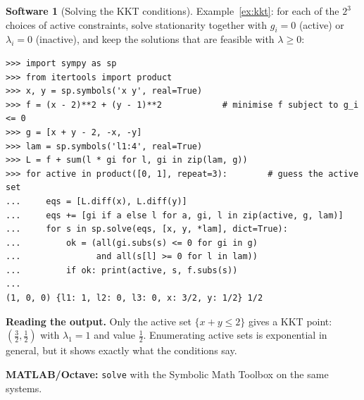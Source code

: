 \documentclass[11pt,a4paper]{article}
\numberwithin{equation}{section}
\theoremstyle{definition}
\newtheorem{software}[thm]{Software}
\begin{document}
\begin{software}[Solving the KKT conditions]
\label{sw:kkt}
Example~\ref{ex:kkt}: for each of the $2^3$ choices of active constraints, solve stationarity together with $g_i = 0$ (active) or $\lambda_i = 0$ (inactive), and keep the solutions that are feasible with $\lambda \geq 0$:
{\small\begin{verbatim}
>>> import sympy as sp
>>> from itertools import product
>>> x, y = sp.symbols('x y', real=True)
>>> f = (x - 2)**2 + (y - 1)**2            # minimise f subject to g_i <= 0
>>> g = [x + y - 2, -x, -y]
>>> lam = sp.symbols('l1:4', real=True)
>>> L = f + sum(l * gi for l, gi in zip(lam, g))
>>> for active in product([0, 1], repeat=3):        # guess the active set
...     eqs = [L.diff(x), L.diff(y)]
...     eqs += [gi if a else l for a, gi, l in zip(active, g, lam)]
...     for s in sp.solve(eqs, [x, y, *lam], dict=True):
...         ok = (all(gi.subs(s) <= 0 for gi in g)
...               and all(s[l] >= 0 for l in lam))
...         if ok: print(active, s, f.subs(s))
...
(1, 0, 0) {l1: 1, l2: 0, l3: 0, x: 3/2, y: 1/2} 1/2
\end{verbatim}}
\textbf{Reading the output.} Only the active set $\{x + y \leq 2\}$ gives a KKT point: $(\frac32, \frac12)$ with $\lambda_1 = 1$ and value $\frac12$. Enumerating active sets is exponential in general, but it shows exactly what the conditions say.

\textbf{MATLAB/Octave:} \texttt{solve} with the Symbolic Math Toolbox on the same systems.
\end{software}
\end{document}
